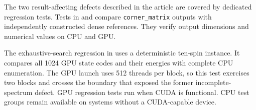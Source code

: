 The two result-affecting defects described in the article are covered by
dedicated regression tests. Tests in
 and
 compare
\texttt{corner\_matrix} outputs with independently constructed dense references.
They verify output dimensions and numerical values on CPU and GPU.

The exhaustive-search regression in  uses a
deterministic ten-spin instance. It compares all 1024 GPU state codes and their
energies with complete CPU enumeration. The GPU launch uses 512 threads per
block, so this test exercises two blocks and crosses the boundary that exposed
the former incomplete-spectrum defect. GPU regression tests run when CUDA is
functional. CPU test groups remain available on systems without a CUDA-capable
device.
